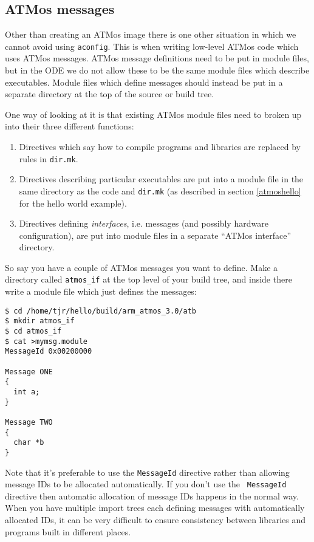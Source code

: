 \documentclass[11pt,twoside,onecolumn]{article}
\begin{document}
\subsection{ATMos messages}
\label{atmosmessages}

Other than creating an ATMos image there is one other situation in which we
cannot avoid using {\tt aconfig}.  This is when writing low-level ATMos code
which uses ATMos messages.  ATMos message definitions need to be put in module
files, but in the ODE we do not allow these to be the same module files which
describe executables.  Module files which define messages should instead be put
in a separate directory at the top of the source or build tree.

One way of looking at it is that existing ATMos module files need to broken up
into their three different functions:

\begin{enumerate}
\item Directives which say how to compile programs and libraries are replaced
by rules in {\tt dir.mk}.
\item Directives describing particular executables are put into a module file
in the same directory as the code and {\tt dir.mk} (as described in section
\ref{atmoshello} for the hello world example).
\item Directives defining {\em interfaces}, i.e. messages (and possibly
hardware configuration), are put into module files in a separate ``ATMos
interface'' directory.
\end{enumerate}

So say you have a couple of ATMos messages you want to define.  Make a
directory called \verb|atmos_if| at the top level of your build tree, and
inside there write a module file which just defines the messages:

{\footnotesize \begin{verbatim}
$ cd /home/tjr/hello/build/arm_atmos_3.0/atb
$ mkdir atmos_if
$ cd atmos_if
$ cat >mymsg.module
MessageId 0x00200000

Message ONE
{
  int a;
}

Message TWO
{
  char *b
}
\end{verbatim}}

Note that it's preferable to use the {\tt MessageId} directive rather than
allowing message IDs to be allocated automatically.  If you don't use the {\tt
MessageId} directive then automatic allocation of message IDs happens in the
normal way.  When you have multiple import trees each defining messages with
automatically allocated IDs, it can be very difficult to ensure consistency
between libraries and programs built in different places.
\end{document}
